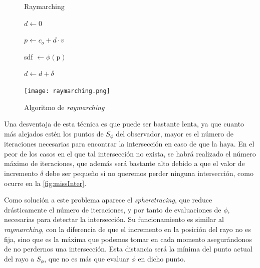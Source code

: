 \begin{figure}[ht!]
    \centering
    \begin{minipage}{0.58\textwidth}
        \begin{algorithm}[H]
            \caption{Raymarching}
                
                $d \gets 0$ 
                
                 {
                    $p \gets c_o +d\cdot v$
                    
                    sdf $\gets \phi(\text{p})$
                    
            
                    $d\gets d + \delta$\;
            
                }
        \end{algorithm}
    \end{minipage}%
    \hfill
    \begin{minipage}{0.4\textwidth}
        \texttt{[image: raymarching.png]}
    \end{minipage}
    \caption{Algoritmo de \textit{raymarching}}
    \label{a:raymarching}
\end{figure}

Una desventaja de esta técnica es que puede ser bastante lenta, ya que cuanto más alejados estén los puntos de $S_\phi$ del observador, mayor es el número de iteraciones necesarias para encontrar la intersección en caso de que la haya. En el peor de los casos en el que tal intersección no exista, se habrá realizado el número máximo de iteraciones, que además será bastante alto debido a que el valor de incremento $\delta$ debe ser pequeño si no queremos perder ninguna intersección, como ocurre en la \autoref{fig:missInter}.\newline

Como solución a este problema aparece el \textit{spheretracing}, que reduce drásticamente el número de iteraciones, y por tanto de evaluaciones de $\phi$, necesarias para detectar la intersección. Su funcionamiento es similar al \textit{raymarching}, con la diferencia de que el incremento en la posición del rayo no es fija, sino que es la máxima que podemos tomar en cada momento asegurándonos de no perdernos una intersección. Esta distancia será la mínima del punto actual del rayo a $S_\phi$, que no es más que evaluar $\phi$ en dicho punto.\newline

